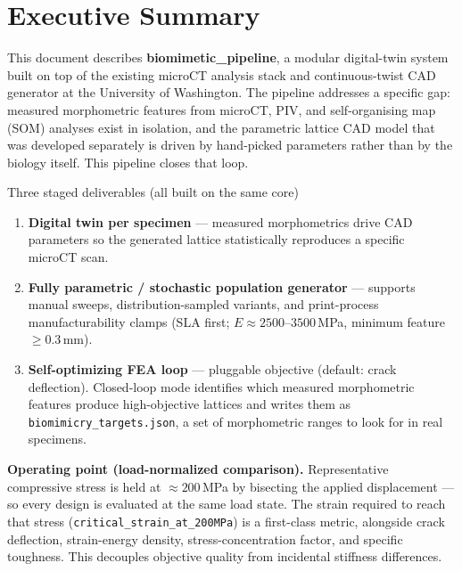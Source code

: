\documentclass[11pt, letterpaper]{article}
\begin{document}
\tableofcontents
\newpage

\section{Executive Summary}

This document describes \textbf{biomimetic\_pipeline}, a modular digital-twin system built on top of the existing microCT analysis stack and continuous-twist CAD generator at the University of Washington. The pipeline addresses a specific gap: measured morphometric features from microCT, PIV, and self-organising map (SOM) analyses exist in isolation, and the parametric lattice CAD model that was developed separately is driven by hand-picked parameters rather than by the biology itself. This pipeline closes that loop.

\begin{conclusionbox}{Three staged deliverables (all built on the same core)}
\begin{enumerate}
  \item \textbf{Digital twin per specimen} — measured morphometrics drive CAD parameters so the generated lattice statistically reproduces a specific microCT scan.
  \item \textbf{Fully parametric / stochastic population generator} — supports manual sweeps, distribution-sampled variants, and print-process manufacturability clamps (SLA first; $E \approx 2500$--$3500$\,MPa, minimum feature $\geq 0.3$\,mm).
  \item \textbf{Self-optimizing FEA loop} — pluggable objective (default: crack deflection). Closed-loop mode identifies which measured morphometric features produce high-objective lattices and writes them as \texttt{biomimicry\_targets.json}, a set of morphometric ranges to look for in real specimens.
\end{enumerate}
\end{conclusionbox}

\begin{mechanismbox}
\textbf{Operating point (load-normalized comparison).} Representative compressive stress is held at $\approx 200$\,MPa by bisecting the applied displacement — so every design is evaluated at the same load state. The strain required to reach that stress (\texttt{critical\_strain\_at\_200MPa}) is a first-class metric, alongside crack deflection, strain-energy density, stress-concentration factor, and specific toughness. This decouples objective quality from incidental stiffness differences.
\end{mechanismbox}
\end{document}
